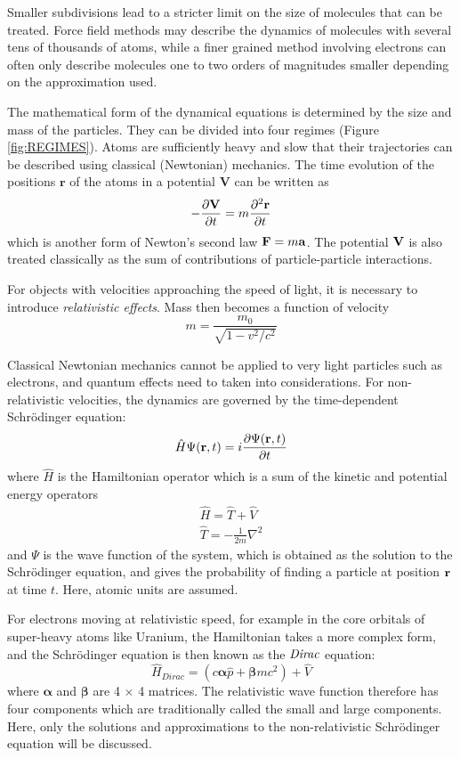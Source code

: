 Smaller subdivisions lead to a stricter limit on the size of molecules that can be treated. Force field methods may describe the dynamics of molecules with several tens of thousands of atoms, while a finer grained method involving electrons can often only describe molecules one to two orders of magnitudes smaller depending on the approximation used.

The mathematical form of the dynamical equations is determined by the size and mass of the particles. They can be divided into four regimes (Figure \ref{fig:REGIMES}). Atoms are sufficiently heavy and slow that their trajectories can be described using classical (Newtonian) mechanics. The time evolution of the positions $\mathbf{r}$ of the atoms in a potential $\mathbf{V}$ can be written as
\begin{equation}
-\frac{\partial \mathbf{V}}{\partial t} = m\frac{\partial^2 \mathbf{r}}{\partial t}
\end{equation} 
\noindent which is another form of Newton's second law $\mathbf{F} = m\mathbf{a}$. The potential $\mathbf{V}$ is also treated classically as the sum of contributions of particle-particle interactions.

For objects with velocities approaching the speed of light, it is necessary to introduce \emph{relativistic effects}. Mass then becomes a function of velocity
\begin{equation}
m = \frac{m_0}{\sqrt{1-v^2/c^2}}
\end{equation}

Classical Newtonian mechanics cannot be applied to very light particles such as electrons, and quantum effects need to taken into considerations. For non-relativistic velocities, the dynamics are governed by the time-dependent Schrödinger equation:
\begin{equation}
\hat{H} \Psi(\mathbf{r},t) = i \frac{\partial \Psi(\mathbf{r},t)}{\partial t}
\end{equation}
\noindent where $\hat{H}$ is the Hamiltonian operator which is a sum of the kinetic and potential energy operators
\begin{align}
\hat{H} = \hat{T} + \hat{V} \\
\hat{T} = -\frac{1}{2m} \nabla^2
\end{align}
\noindent and $\Psi$ is the wave function of the system, which is obtained as the solution to the Schrödinger equation, and gives the probability of finding a particle at position $\mathbf{r}$ at time $t$. Here, atomic units are assumed.

For electrons moving at relativistic speed, for example in the core orbitals of super-heavy atoms like Uranium, the Hamiltonian takes a more complex form, and the Schrödinger equation is then known as the $\emph{Dirac}$ equation:
\begin{equation}
\hat{H}_{Dirac} = \left(c\boldsymbol{\alpha} \hat{p} + \boldsymbol{\beta}mc^2\right) + \hat{V}
\end{equation}
\noindent where $\boldsymbol{\alpha}$ and $\boldsymbol{\beta}$ are 4 $\times$ 4 matrices. The relativistic wave function therefore has four components which are traditionally called the small and large components. Here, only the solutions and approximations to the non-relativistic Schrödinger equation will be discussed.

